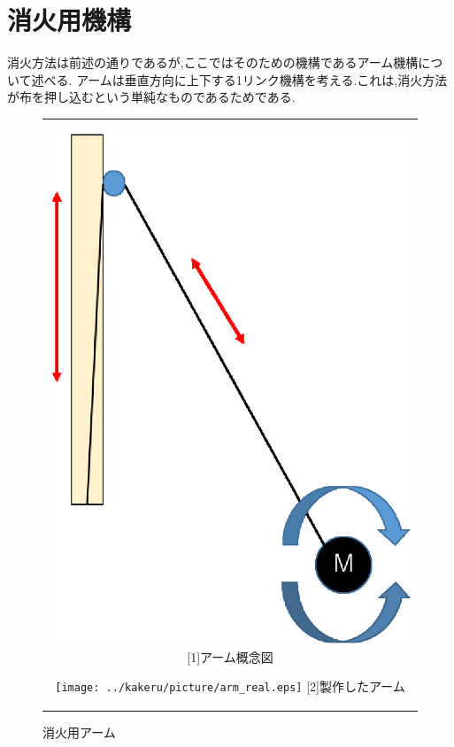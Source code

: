 \section{消火用機構}
消火方法は前述の通りであるが,ここではそのための機構であるアーム機構について述べる.
アームは垂直方向に上下する1リンク機構を考える.これは,消火方法が布を押し込むという単純なものであるためである.

\begin{figure}[bH]
 \centering
 \begin{tabular}{c}
  
  \begin{minipage}{0.3\hsize}
   \centering
   \includegraphics[clip,scale=0.3]{../kakeru/picture/arm_img.eps}
   \hspace{1cm} [1]アーム概念図
  \end{minipage}
  
  \begin{minipage}{0.45\hsize}
   \centering
   \texttt{[image: ../kakeru/picture/arm\_real.eps]}
   \hspace{1.6cm} [2]製作したアーム
  \end{minipage}
 \end{tabular}
 \caption{消火用アーム}
 \label{arm}
\end{figure}
